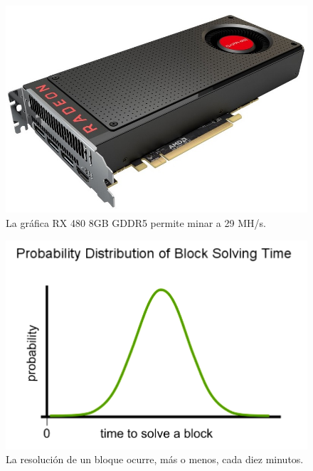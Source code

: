 \documentclass[twoside]{article}
\theoremstyle{definition}
\begin{document}
\begin{figure}[h!]
\includegraphics[scale=0.15]{grafica}
\captionsetup{labelformat=empty}
 \caption{La gráfica RX 480 8GB GDDR5 permite minar a  29 MH/s.}
\end{figure}


\begin{figure}[h]
\includegraphics[scale=0.45]{distribution}
\captionsetup{labelformat=empty}
 \caption{La resolución de un bloque ocurre, más o menos, cada diez minutos.}
\end{figure}

\newpage
\end{document}
